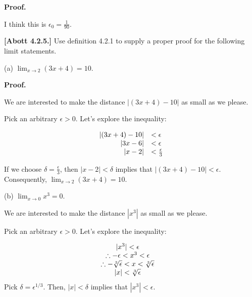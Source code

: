 \documentclass[10pt]{article}
\begin{document}
\textbf{Proof.}



I think this is $\displaystyle \epsilon _{0} =\frac{1}{90}$.



\textbf{[Abott 4.2.5.]} Use definition 4.2.1 to supply a proper proof for the following limit statements.



(a) $\displaystyle \lim _{x\rightarrow 2}( 3x+4) =10$.



\textbf{Proof.}



We are interested to make the distance $\displaystyle |( 3x+4) -10|$ as small as we please. 



Pick an arbitrary $\displaystyle \epsilon  >0$. Let's explore the inequality:


\begin{equation*}
\begin{array}{ r l }
|( 3x+4) -10| & < \epsilon \\
|3x-6| & < \epsilon \\
|x-2| & < \frac{\epsilon }{3}
\end{array}
\end{equation*}


If we choose $\displaystyle \delta =\frac{\epsilon }{3}$, then $\displaystyle |x-2|< \delta $ implies that $\displaystyle |( 3x+4) -10|< \epsilon $. Consequently, $\displaystyle \lim _{x\rightarrow 2}( 3x+4) =10$.



(b) $\displaystyle \lim _{x\rightarrow 0} x^{3} =0$.



We are interested to make the distance $\displaystyle |x^{3} |$ as small as we please.



Pick an arbitrary $\displaystyle \epsilon  >0$. Let's explore the inequality:




\begin{equation*}
\begin{array}{ c c }
|x^{3} |< \epsilon  & \\
\therefore -\epsilon < x^{3} < \epsilon  & \\
\therefore -\sqrt[3] \epsilon < x< \sqrt[3] \epsilon  & \\
|x|< \sqrt[3] \epsilon  & 
\end{array}
\end{equation*}
 Pick $\displaystyle \delta =\epsilon ^{1/3}$. Then, $\displaystyle |x|< \delta $ implies that $\displaystyle |x^{3} |< \epsilon $.
\end{document}
